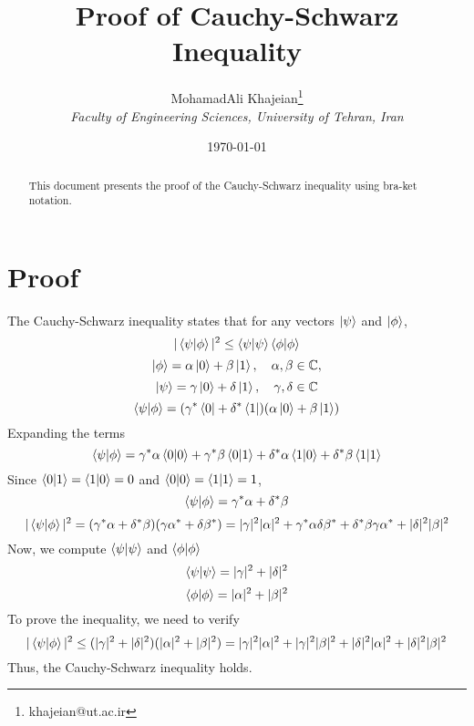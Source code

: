 \documentclass[12pt]{article}
\title{\textbf{Proof of Cauchy-Schwarz Inequality}}
\author{
    MohamadAli Khajeian\footnote{khajeian@ut.ac.ir} \\ 
    \small \textit{Faculty of Engineering Sciences, University of Tehran, Iran} \\ 
}
\date{\today}
\begin{document}
\maketitle

\begin{abstract}
    This document presents the proof of the Cauchy-Schwarz inequality using bra-ket notation.
\end{abstract}

\section*{Proof}

The Cauchy-Schwarz inequality states that for any vectors \( \ket{\psi} \) and \( \ket{\phi} \),
\begin{equation*}
    |\braket{\psi|\phi}|^2 \leq \braket{\psi|\psi} \braket{\phi|\phi}
\end{equation*}
\[
\ket{\phi} = \alpha \ket{0} + \beta \ket{1}, \quad \alpha, \beta \in \mathbb{C},
\]
\[
\ket{\psi} = \gamma \ket{0} + \delta \ket{1}, \quad \gamma, \delta \in \mathbb{C}
\]
\[
\braket{\psi|\phi} = (\gamma^* \bra{0} + \delta^* \bra{1})(\alpha \ket{0} + \beta \ket{1})
\]
Expanding the terms
\[
\braket{\psi|\phi} = \gamma^* \alpha \braket{0|0} + \gamma^* \beta \braket{0|1} + \delta^* \alpha \braket{1|0} + \delta^* \beta \braket{1|1}
\]
Since \( \braket{0|1} = \braket{1|0} = 0 \) and \( \braket{0|0} = \braket{1|1} = 1 \),
\[
\braket{\psi|\phi} = \gamma^* \alpha + \delta^* \beta
\]
\begin{equation*}
|\braket{\psi|\phi}|^2 = (\gamma^* \alpha + \delta^* \beta)(\gamma \alpha^* + \delta \beta^*) = |\gamma|^2 |\alpha|^2 + \gamma^* \alpha \delta \beta^* + \delta^* \beta \gamma \alpha^* + |\delta|^2 |\beta|^2
\end{equation*}
Now, we compute \( \braket{\psi|\psi} \) and \( \braket{\phi|\phi} \)
\[
\braket{\psi|\psi} = |\gamma|^2 + |\delta|^2
\]
\[
\braket{\phi|\phi} = |\alpha|^2 + |\beta|^2
\]
To prove the inequality, we need to verify
\[
|\braket{\psi|\phi}|^2 \leq (|\gamma|^2 + |\delta|^2)(|\alpha|^2 + |\beta|^2)  = |\gamma|^2 |\alpha|^2 + |\gamma|^2 |\beta|^2 + |\delta|^2 |\alpha|^2 + |\delta|^2 |\beta|^2
\]
Thus, the Cauchy-Schwarz inequality holds.
\end{document}
